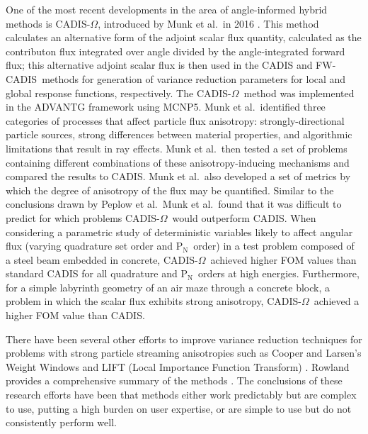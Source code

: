 \documentclass{article} %
\newcommand{\pn}{P$_\mathrm{N}$}
\newcommand{\fwc}{\mbox{FW-CADIS}}
\newcommand{\co}{\mbox{CADIS-$\Omega$}}
\begin{document}
One of the most recent developments in the area of angle-informed hybrid
methods is \co, introduced by Munk et al.\ in 2016 \cite{cadisom}. This method
calculates an alternative form of the adjoint scalar flux quantity, calculated
as the contributon flux integrated over angle divided by the angle-integrated
forward flux; this alternative adjoint scalar flux is then used in the CADIS
and \fwc\ methods for generation of variance reduction parameters for local
and global response functions, respectively. The \co\ method was implemented
in the ADVANTG framework using MCNP5. Munk et al.\ identified three categories
of processes that affect particle flux anisotropy: strongly-directional
particle sources, strong differences between material properties, and
algorithmic limitations that result in ray effects. Munk et al.\ then tested a
set of problems containing different combinations of these anisotropy-inducing
mechanisms and compared the results to CADIS. Munk et al.\ also developed a
set of metrics by which the degree of anisotropy of the flux may be
quantified. Similar to the conclusions drawn by Peplow et al.\, Munk et al.\
found that it was difficult to predict for which problems \co\ would
outperform CADIS. When considering a parametric study of deterministic
variables likely to affect angular flux (varying quadrature set order and \pn\
order) in a test problem composed of a steel beam embedded in concrete, \co\
achieved higher FOM values than standard CADIS for all quadrature and \pn\
orders at high energies. Furthermore, for a simple labyrinth geometry of an air
maze through a concrete block, a problem in which the scalar flux exhibits strong
anisotropy, \co\ achieved a higher FOM value than CADIS.

There have been several other efforts to improve variance reduction techniques
for problems with strong particle streaming anisotropies such as Cooper and
Larsen's Weight Windows \cite{clww} and LIFT (Local Importance Function
Transform) \cite{lift1, lift2}. Rowland provides a comprehensive summary of the
methods \cite{kr}. The conclusions of these research efforts have
been that methods either work predictably but are complex to use, putting a
high burden on user expertise, or are simple to use but do not consistently
perform well.
\end{document}

